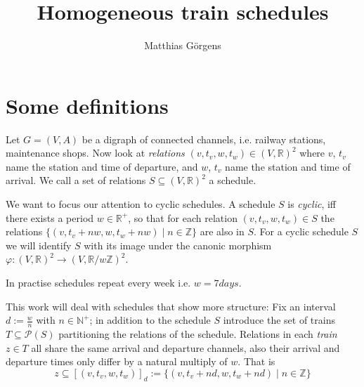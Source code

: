 \documentclass{article} %
\begin{document}
\author{Matthias Görgens}
\title{Homogeneous train schedules}
\maketitle
{}


\section{Some definitions}

Let \(G=(V,A)\) be a digraph of connected channels, i.e. railway
stations, maintenance shops.  Now look at \label{relation}
\textit{relations} \((v, t_v, w, t_w) \in \left(V,\mathbb{R}\right)^2
\) where \(v\), \(t_v\) name the station and time of departure, and
\(w\), \(t_v\) name the station and time of arrival.  We call a set of
relations \(S \subseteq \left(V,\mathbb{R}\right)^2\) a schedule.

We want to focus our attention to cyclic schedules.  A schedule \(S\)
is \label{cyclic} \textit{cyclic}, iff there exists a period \(w \in
\mathbb{R}^+\), so that for each relation \((v, t_v, w, t_w) \in S\)
the relations \(\{(v, t_v+n w, w, t_w +n w) \mid n \in \mathbb{Z}\}\)
are also in \(S\).  For a cyclic schedule \(S\) we will identify \(S\)
with its image under the canonic morphism \(\varphi \colon
\left(V,\mathbb{R}\right)^2 \to \left(V,\mathbb{R}/{w
    \mathbb{Z}}\right)^2\).

In practise schedules repeat every week i.e. \(w = 7 \unit{days}\).

This work will deal with schedules that show more structure: Fix an
interval \(d := \frac{w}{n}\) with \(n \in \mathbb{N}^+\); in addition
to the schedule \(S\) introduce the set of trains \(T \subseteq
\mathcal{P}(S)\) partitioning the relations of the schedule.
Relations in each \textit{train} \(z \in T\) all share the same arrival
and departure channels, also their arrival and departure times only
differ by a natural multiply of \(w\).  That is
\begin{equation}
  z \subseteq [(v, t_v, w, t_w )]_d := \{(v, t_v+n d, w, t_w +n d) \mid n \in \mathbb{Z}\}
\end{equation}
\end{document}
